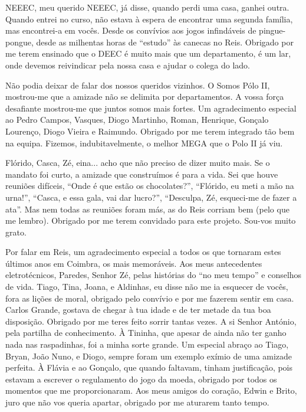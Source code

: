 NEEEC, meu querido NEEEC, já disse, quando perdi uma casa, ganhei outra. Quando entrei no curso, não estava à espera de encontrar uma segunda família, mas encontrei-a em vocês. Desde os convívios aos jogos infindáveis de pingue-pongue, desde as milhentas horas de ``estudo'' às canecas no Reis. Obrigado por me terem ensinado que o DEEC é muito mais que um departamento, é um lar, onde devemos reivindicar pela nossa casa e ajudar o colega do lado.

Não podia deixar de falar dos nossos queridos vizinhos. O Somos Pólo II, mostrou-me que a amizade não se delimita por departamentos. A vossa força desafiante mostrou-me que juntos somos mais fortes. Um agradecimento especial ao Pedro Campos, Vasques, Diogo Martinho, Roman, Henrique, Gonçalo Lourenço, Diogo Vieira e Raimundo. Obrigado por me terem integrado tão bem na equipa. Fizemos, indubitavelmente, o melhor MEGA que o Polo II já viu.

Flórido, Casca, Zé, eina... acho que não preciso de dizer muito mais. Se o mandato foi curto, a amizade que construímos é para a vida. Sei que houve reuniões difíceis, ``Onde é que estão os chocolates?'', ``Flórido, eu meti a mão na urna!'', ``Casca, e essa gala, vai dar lucro?'', ``Desculpa, Zé, esqueci-me de fazer a ata''. Mas nem todas as reuniões foram más, as do Reis corriam bem (pelo que me lembro). Obrigado por me terem convidado para este projeto. Sou-vos muito grato.

Por falar em Reis, um agradecimento especial a todos os que tornaram estes últimos anos em Coimbra, os mais memoráveis. Aos meus antecedentes eletrotécnicos, Paredes, Senhor Zé, pelas histórias do ``no meu tempo'' e conselhos de vida. Tiago, Tina, Joana, e Aldinhas, eu disse não me ia esquecer de vocês, fora as lições de moral, obrigado pelo convívio e por me fazerem sentir em casa. Carlos Grande, gostava de chegar à tua idade e de ter metade da tua boa disposição. Obrigado por me teres feito sorrir tantas vezes. A si Senhor António, pela partilha de conhecimento. À Tininha, que apesar de ainda não ter ganho nada nas raspadinhas, foi a minha sorte grande. Um especial abraço ao Tiago, Bryan, João Nuno, e Diogo, sempre foram um exemplo exímio de uma amizade perfeita. À Flávia e ao Gonçalo, que quando faltavam, tinham justificação, pois estavam a escrever o regulamento do jogo da moeda, obrigado por todos os momentos que me proporcionaram. Aos meus amigos do coração, Edwin e Brito, juro que não vos queria apartar, obrigado por me aturarem tanto tempo.

